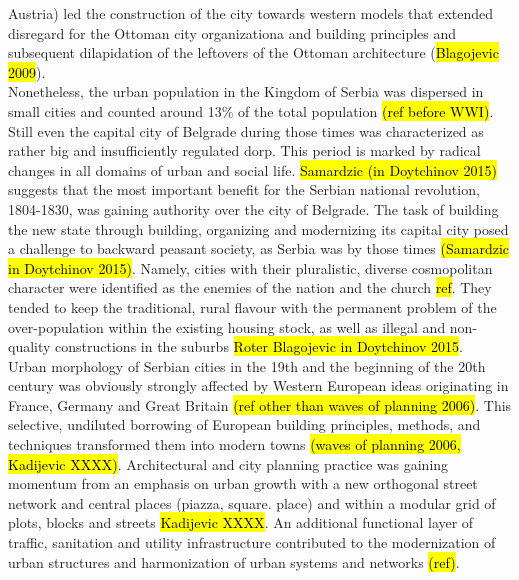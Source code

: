 \documentclass[11pt]{report}
\begin{document}
Austria) led the construction of the city towards western models that extended disregard for the Ottoman city organizationa and building principles and subsequent dilapidation of the leftovers of the Ottoman architecture (\hl{Blagojevic 2009}).
\\
Nonetheless, the urban population in the Kingdom of Serbia was dispersed in small cities and counted around 13\% of the total population \hl{(ref before WWI)}. Still even the capital city of Belgrade during those times was characterized as rather big and insufficiently regulated dorp.
This period is marked by radical changes in all domains of urban and social life. 
\hl{Samardzic (in Doytchinov 2015)} suggests that the most important benefit for the Serbian national revolution, 1804-1830, was gaining authority over the city of Belgrade. The task of building the new state through building, organizing and modernizing its capital city posed a challenge to backward peasant society, as Serbia was by those times \hl{(Samardzic in Doytchinov 2015)}. Namely, cities with their pluralistic, diverse cosmopolitan character were identified as the enemies of the nation and the church \hl{ref}. They tended to keep the traditional, rural flavour with the permanent problem of the over-population within the existing housing stock, as well as illegal and non-quality constructions in the suburbs \hl{Roter Blagojevic in Doytchinov 2015}.
\\  
Urban morphology of Serbian cities in the 19th and the beginning of the 20th century was obviously strongly affected by Western European ideas originating in France, Germany and Great Britain \hl{(ref other than waves of planning 2006)}. This selective, undiluted borrowing of European building principles, methods, and techniques transformed them into modern towns \hl{(waves of planning 2006, Kadijevic XXXX)}. Architectural and city planning practice was gaining momentum from an emphasis on urban growth with a new orthogonal street network and central places (piazza, square. place) and within a modular grid of plots, blocks and streets \hl{Kadijevic XXXX}. An additional functional layer of traffic, sanitation and utility infrastructure contributed to the modernization of urban structures and harmonization of urban systems and networks \hl{(ref)}.
\end{document}
